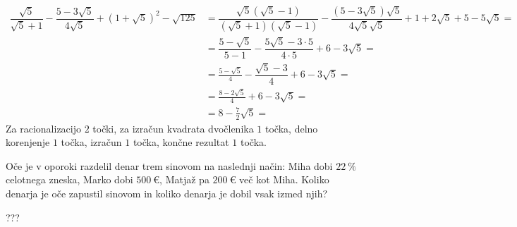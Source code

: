 \documentclass[addpoints]{exam}
\begin{document}
\begin{questions}
    \begin{solution}[6cm]
        \begin{align*} 
            \dfrac{\sqrt{5}}{\sqrt{5}+1}-\dfrac{5-3\sqrt{5}}{4\sqrt{5}}+\left(1+\sqrt{5}\right)^2-\sqrt{125}&=\dfrac{\sqrt{5}(\sqrt{5}-1)}{(\sqrt{5}+1)(\sqrt{5}-1)}-\dfrac{(5-3\sqrt{5})\sqrt{5}}{4\sqrt{5}\sqrt{5}}+1+2\sqrt{5}+5-5\sqrt{5}= \\
                                                                                                            &=\dfrac{5-\sqrt{5}}{5-1}-\dfrac{5\sqrt{5}-3\cdot 5}{4\cdot 5}+6-3\sqrt{5}= \\
                                                                                                            &=\frac{5-\sqrt{5}}{4}-\dfrac{\sqrt{5}-3}{4}+6-3\sqrt{5}= \\
                                                                                                            &=\frac{8-2\sqrt{5}}{4}+6-3\sqrt{5}= \\
                                                                                                            &=8-\frac{7}{2}\sqrt{5}= 
        \end{align*}
        Za racionalizacijo $2$ točki, za izračun kvadrata dvočlenika $1$ točka, delno korenjenje $1$ točka, izračun $1$ točka, končne rezultat $1$ točka.
    \end{solution}
    
    


    
    


    \question[4]
    Oče je v oporoki razdelil denar trem sinovom na naslednji način:
    Miha dobi $22~\%$ celotnega zneska, Marko dobi $500~€$, Matjaž pa $200~€$ več kot Miha.
    Koliko denarja je oče zapustil sinovom in koliko denarja je dobil vsak izmed njih?
    
    \begin{solution}[3cm]
        ???
    \end{solution}



\end{questions}
\end{document}
